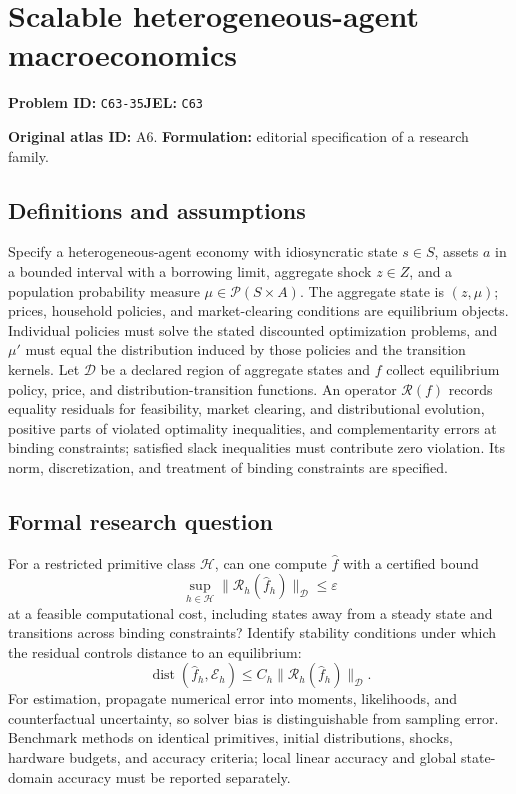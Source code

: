 \documentclass[11pt,a4paper]{article}
\begin{document}
\section*{Scalable heterogeneous-agent macroeconomics}
\textbf{Problem ID:} \texttt{C63-35}\quad \textbf{JEL:} \texttt{C63}\par
\label{problem:OP-0016}
\label{atlas:prob:A6}

\noindent\textbf{Original atlas ID:} A6. \textbf{Formulation:} editorial specification of a research family.

\subsection*{Definitions and assumptions}

Specify a heterogeneous-agent economy with idiosyncratic state $s\in S$, assets $a$ in a bounded interval with a borrowing limit, aggregate shock $z\in Z$, and a population probability measure $\mu\in\mathcal P(S\times A)$. The aggregate state is $(z,\mu)$; prices, household policies, and market-clearing conditions are equilibrium objects. Individual policies must solve the stated discounted optimization problems, and $\mu'$ must equal the distribution induced by those policies and the transition kernels. Let $\mathcal D$ be a declared region of aggregate states and $f$ collect equilibrium policy, price, and distribution-transition functions. An operator $\mathcal R(f)$ records equality residuals for feasibility, market clearing, and distributional evolution, positive parts of violated optimality inequalities, and complementarity errors at binding constraints; satisfied slack inequalities must contribute zero violation. Its norm, discretization, and treatment of binding constraints are specified.

\subsection*{Formal research question}

For a restricted primitive class $\mathcal H$, can one compute $\hat f$ with a certified bound
\[
\sup_{h\in\mathcal H}\|\mathcal R_h(\hat f_h)\|_{\mathcal D}\le\varepsilon
\]
at a feasible computational cost, including states away from a steady state and transitions across binding constraints? Identify stability conditions under which the residual controls distance to an equilibrium:
\[
\operatorname{dist}(\hat f_h,\mathcal E_h)\le C_h\|\mathcal R_h(\hat f_h)\|_{\mathcal D}.
\]
For estimation, propagate numerical error into moments, likelihoods, and counterfactual uncertainty, so solver bias is distinguishable from sampling error. Benchmark methods on identical primitives, initial distributions, shocks, hardware budgets, and accuracy criteria; local linear accuracy and global state-domain accuracy must be reported separately.
\end{document}
